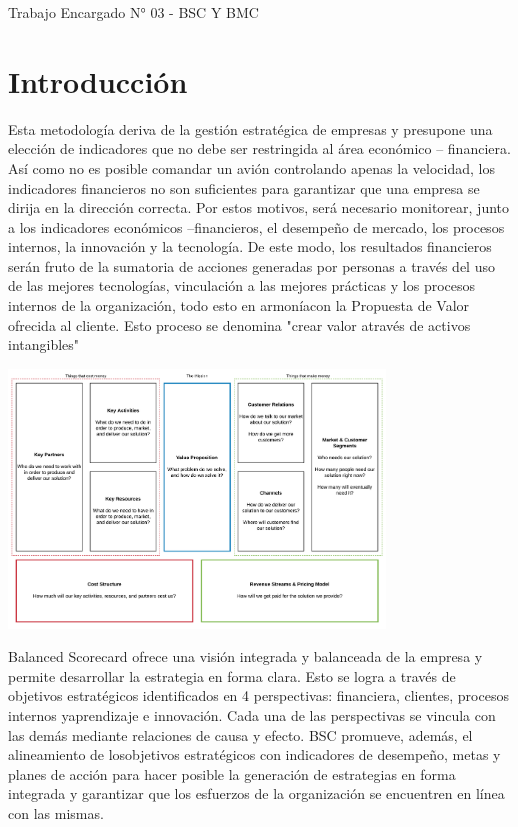 \newpage

\begin{center}
    Trabajo Encargado N° 03 - BSC Y BMC
\end{center}

\section{Introducción}
\item{Esta metodología deriva de la gestión estratégica de empresas y presupone una elección de indicadores que no debe ser restringida al área económico – financiera. Así como no es posible comandar un avión controlando apenas la velocidad, los indicadores financieros no son suficientes para garantizar que una empresa se dirija en la dirección correcta. Por estos motivos, será necesario monitorear, junto a los indicadores económicos –financieros, el desempeño de mercado, los procesos internos, la innovación y la tecnología. De este modo, los resultados financieros serán fruto de la sumatoria de acciones generadas por personas a través del uso de las mejores tecnologías, vinculación a las mejores prácticas y los procesos internos de la organización, todo esto en armoníacon la Propuesta de Valor ofrecida al cliente. Esto proceso se denomina "crear valor através de activos intangibles"}

\begin{center}
\includegraphics[width=10cm]{./Imagenes/img7}
\end{center}

\item{Balanced Scorecard ofrece una visión integrada y balanceada de la empresa y permite desarrollar la estrategia en forma clara. Esto se logra a través de objetivos estratégicos identificados en 4 perspectivas: financiera, clientes, procesos internos yaprendizaje e innovación. Cada una de las perspectivas se vincula con las demás mediante relaciones de causa y efecto. BSC promueve, además, el alineamiento de losobjetivos estratégicos con indicadores de desempeño, metas y planes de acción para hacer posible la generación de estrategias en forma integrada y garantizar que los esfuerzos de la organización se encuentren en línea con las mismas.}

